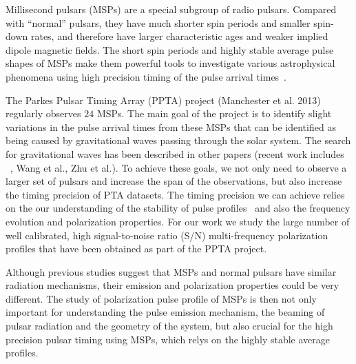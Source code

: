 \documentclass[useAMS,usenatbib]{mn2e}
\begin{document}
Millisecond pulsars (MSPs) are a special subgroup of radio pulsars. 
%
Compared with ``normal'' pulsars, they have much shorter spin periods 
and smaller spin-down rates, and therefore have larger characteristic 
ages and weaker implied dipole magnetic fields.
%
The short spin periods and highly stable average pulse shapes of MSPs 
make them powerful tools to investigate various astrophysical phenomena 
using high precision timing of the pulse arrival times~\citep[e.g.,][]{Manchester08}.
%

The Parkes Pulsar Timing Array (PPTA) project (Manchester et al. 2013) 
regularly observes $24$ MSPs. The main goal of the project is to identify 
slight variations in the pulse arrival times from these MSPs that can be 
identified as being caused by gravitational waves passing through the solar 
system.  
%
The search for gravitational waves has been described in other papers (recent 
work includes ~\citet{Shannon13b}, Wang et al., Zhu et al.). 
%
To achieve these goals, we not only need to observe a larger set of pulsars 
and increase the span of the observations, but also increase the timing 
precision of PTA datasets.
%
%
%
The timing precision we can achieve relies on the our understanding of the 
stability of pulse profiles~\citep[e.g.,][]{Shannon14} and also the frequency 
evolution and polarization properties.
%
For our work we study the large number of well calibrated, high signal-to-noise 
ratio (S/N) multi-frequency polarization profiles that have been obtained as 
part of the PPTA project. 
%

Although previous studies suggest that MSPs and normal pulsars have 
similar radiation mechanisms, their emission and polarization properties 
could be very different.
%
The study of polarization pulse profile of MSPs is then not only important 
for understanding the pulse emission mechanism, the beaming of pulsar 
radiation and the geometry of the system, but also crucial for the 
high precision pulsar timing using MSPs, which relys on the highly stable 
average profiles.
%
\end{document}
